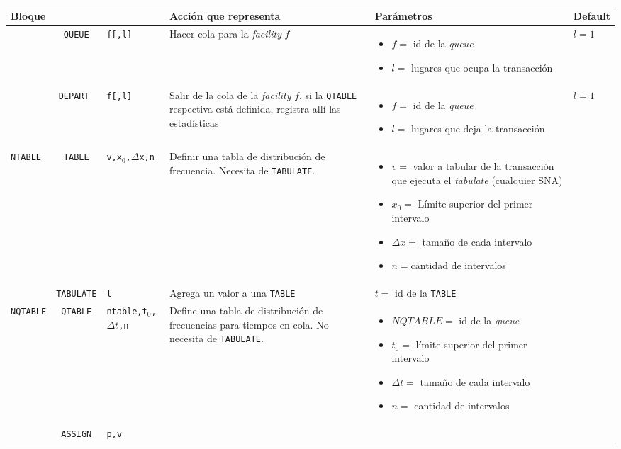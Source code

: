 \documentclass[12pt, a4paper, twoside]{paquetes-apunte/apunte}
\providecommand{\tabularnewline}{\\}
\begin{document}
\begin{longtable}{|lc>{\raggedright}p{3cm}|>{\raggedright}p{5cm}|>{\raggedright}p{7cm}|>{\raggedright}p{4cm}|}
\hline
\multicolumn{3}{|l|}{\textbf{Bloque}} & \textbf{Acción que representa} & \textbf{Parámetros} & \textbf{Default}\tabularnewline
\hline
\hline
 & \texttt{QUEUE} & \texttt{f{[},l{]}} & Hacer cola para la \emph{facility} $f$ & \begin{itemize}
\item $f=$ id de la \emph{queue}
\item $l=$ lugares que ocupa la transacción\end{itemize}
 & $l=1$\tabularnewline
\hline 
 & \texttt{DEPART } & \texttt{f{[},l{]}} & Salir de la cola de la \emph{facility} $f$, si la \texttt{QTABLE}
respectiva está definida, registra allí las estadísticas & \begin{itemize}
\item $f=$ id de la \emph{queue}
\item $l=$ lugares que deja la transacción \end{itemize}
 & $l=1$\tabularnewline
\hline 
\texttt{NTABLE} & \texttt{TABLE} & \texttt{v,x$_{0}$,$\Delta$x,n} & Definir una tabla de distribución de frecuencia. Necesita de \texttt{TABULATE}. & \begin{itemize}
\item $v=$ valor a tabular de la transacción que ejecuta el \emph{tabulate}
(cualquier SNA)
\item $x_{0}=$ Límite superior del primer intervalo
\item $\Delta x=$ tamaño de cada intervalo
\item $n=$cantidad de intervalos\end{itemize}
 & \tabularnewline
\hline 
 & \texttt{TABULATE} & \texttt{t} & Agrega un valor a una \texttt{TABLE} & $t=$ id de la \texttt{TABLE} & \tabularnewline
\hline 
\texttt{NQTABLE} & \texttt{QTABLE} & \texttt{ntable,t$_{0}$,$\Delta t$,n} & Define una tabla de distribución de frecuencias para tiempos en cola.
No necesita de \texttt{TABULATE}. & \begin{itemize}
\item $NQTABLE=$ id de la\emph{ queue}
\item $t_{0}=$ límite superior del primer intervalo
\item $\Delta t=$ tamaño de cada intervalo
\item $n=$ cantidad de intervalos\end{itemize}
 & \tabularnewline
\hline 
 & \texttt{ASSIGN} & \texttt{p,v}


\end{longtable}
\end{document}

